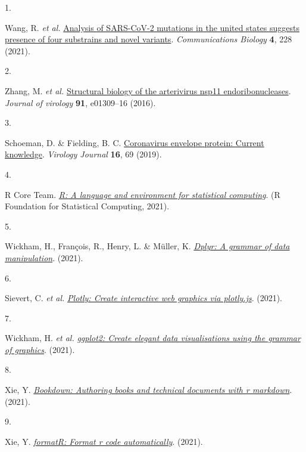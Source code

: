 \documentclass{article}
\newlength{\csllabelwidth}
\newlength{\cslhangindent}
\newenvironment{CSLReferences}[2] %
 {%
  \setlength{\parindent}{0pt}
  \ifodd #1 \everypar{\setlength{\hangindent}{\cslhangindent}}\ignorespaces\fi
  \ifnum #2 > 0
  \setlength{\parskip}{#2\baselineskip}
  \fi
 }%
 {}
\newcommand{\CSLLeftMargin}[1]{\parbox[t]{\csllabelwidth}{#1}}
\newcommand{\CSLRightInline}[1]{\parbox[t]{\linewidth - \csllabelwidth}{#1}\break}
\begin{document}
\hypertarget{refs}{}
\begin{CSLReferences}{0}{0}
\leavevmode{}%
\CSLLeftMargin{1. }
\CSLRightInline{Wang, R. \emph{et al.}
\href{https://doi.org/10.1038/s42003-021-01754-6}{Analysis of SARS-CoV-2
mutations in the united states suggests presence of four substrains and
novel variants}. \emph{Communications Biology} \textbf{4}, 228 (2021).}

\leavevmode{}%
\CSLLeftMargin{2. }
\CSLRightInline{Zhang, M. \emph{et al.}
\href{https://doi.org/10.1128/JVI.01309-16}{Structural biology of the
arterivirus nsp11 endoribonucleases}. \emph{Journal of virology}
\textbf{91}, e01309--16 (2016).}

\leavevmode{}%
\CSLLeftMargin{3. }
\CSLRightInline{Schoeman, D. \& Fielding, B. C.
\href{https://doi.org/10.1186/s12985-019-1182-0}{Coronavirus envelope
protein: Current knowledge}. \emph{Virology Journal} \textbf{16}, 69
(2019).}

\leavevmode{}%
\CSLLeftMargin{4. }
\CSLRightInline{R Core Team. \emph{\href{https://www.R-project.org/}{R:
A language and environment for statistical computing}}. (R Foundation
for Statistical Computing, 2021).}

\leavevmode{}%
\CSLLeftMargin{5. }
\CSLRightInline{Wickham, H., François, R., Henry, L. \& Müller, K.
\emph{\href{https://CRAN.R-project.org/package=dplyr}{Dplyr: A grammar
of data manipulation}}. (2021).}

\leavevmode{}%
\CSLLeftMargin{6. }
\CSLRightInline{Sievert, C. \emph{et al.}
\emph{\href{https://CRAN.R-project.org/package=plotly}{Plotly: Create
interactive web graphics via plotly.js}}. (2021).}

\leavevmode{}%
\CSLLeftMargin{7. }
\CSLRightInline{Wickham, H. \emph{et al.}
\emph{\href{https://CRAN.R-project.org/package=ggplot2}{ggplot2: Create
elegant data visualisations using the grammar of graphics}}. (2021).}

\leavevmode{}%
\CSLLeftMargin{8. }
\CSLRightInline{Xie, Y.
\emph{\href{https://CRAN.R-project.org/package=bookdown}{Bookdown:
Authoring books and technical documents with r markdown}}. (2021).}

\leavevmode{}%
\CSLLeftMargin{9. }
\CSLRightInline{Xie, Y.
\emph{\href{https://github.com/yihui/formatR}{formatR: Format r code
automatically}}. (2021).}


\end{CSLReferences}
\end{document}

